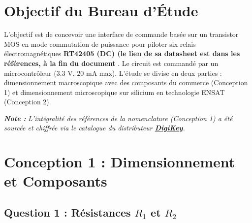 \documentclass[11pt,a4paper]{article}
\begin{document}


\clearpage
\tableofcontents        %

\clearpage
\listoftables           %

\clearpage
\listoffigures          %

\clearpage




\newpage

\section*{Objectif du Bureau d'Étude}
L'objectif est de concevoir une interface de commande basée sur un transistor MOS en mode commutation de puissance pour piloter six relais électromagnétiques \textbf{RT42405 (DC) (le lien de sa datasheet est dans les références, à la fin du document}  . Le circuit est commandé par un microcontrôleur ($3.3\text{ V}$, $20\text{ mA}$ max). L'étude se divise en deux parties : dimensionnement macroscopique avec des composants du commerce (Conception 1) et dimensionnement microscopique sur silicium en technologie ENSAT (Conception 2).

\vspace{0.5em}
\noindent \textit{\textbf{Note :}} \textit{L'intégralité des références de la nomenclature (Conception 1) a été sourcée et chiffrée via le catalogue du distributeur \href{https://www.digikey.fr/}{\textbf{DigiKey}}. }

\section{Conception 1 : Dimensionnement et Composants}

\subsection{Question 1 : Résistances $R_1$ et $R_2$}
\end{document}
